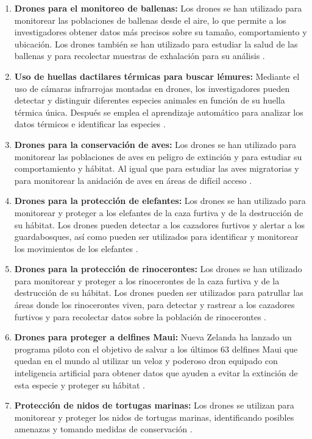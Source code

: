 \begin{enumerate}
\item \textbf{Drones para el monitoreo de ballenas:} Los drones se han utilizado para monitorear las poblaciones de ballenas desde el aire, lo que permite a los investigadores obtener datos más precisos sobre su tamaño, comportamiento y ubicación. Los drones también se han utilizado para estudiar la salud de las ballenas y para recolectar muestras de exhalación para su análisis \cite{33}.
\item \textbf{Uso de huellas dactilares térmicas para buscar lémures:} Mediante el uso de cámaras infrarrojas montadas en drones, los investigadores pueden detectar y distinguir diferentes especies animales en función de su huella térmica única. Después se emplea el aprendizaje automático para analizar los datos térmicos e identificar las especies \cite{34}.
\item \textbf{Drones para la conservación de aves:} Los drones se han utilizado para monitorear las poblaciones de aves en peligro de extinción y para estudiar su comportamiento y hábitat. Al igual que para estudiar las aves migratorias y para monitorear la anidación de aves en áreas de difícil acceso \cite{35}.
\item \textbf{Drones para la protección de elefantes:} Los drones se han utilizado para monitorear y proteger a los elefantes de la caza furtiva y de la destrucción de su hábitat. Los drones pueden detectar a los cazadores furtivos y alertar a los guardabosques, así como pueden ser utilizados para identificar y monitorear los movimientos de los elefantes \cite{36}.
\item \textbf{Drones para la protección de rinocerontes:} Los drones se han utilizado para monitorear y proteger a los rinocerontes de la caza furtiva y de la destrucción de su hábitat. Los drones pueden ser utilizados para patrullar las áreas donde los rinocerontes viven, para detectar y rastrear a los cazadores furtivos y para recolectar datos sobre la población de rinocerontes \cite{37}.
\item \textbf{Drones para proteger a delfines Maui:} Nueva Zelanda ha lanzado un programa piloto con el objetivo de salvar a los últimos 63 delfines Maui que quedan en el mundo al utilizar un veloz y poderoso dron equipado con inteligencia artificial para obtener datos que ayuden a evitar la extinción de esta especie y proteger su hábitat \cite{38}.
\item \textbf{Protección de nidos de tortugas marinas:} Los drones se utilizan para monitorear y proteger los nidos de tortugas marinas, identificando posibles amenazas y tomando medidas de conservación \cite{39}.

\end{enumerate}
